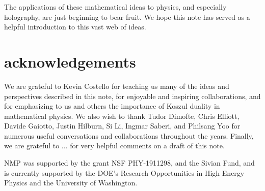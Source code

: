 \documentclass[11pt]{amsart}
\begin{document}
The applications of these mathematical ideas to physics, and especially holography, are just beginning to bear fruit. We hope this note has served as a helpful introduction to this vast web of ideas. 


\section{acknowledgements} We are grateful to Kevin Costello for teaching us many of the ideas and perspectives described in this note, for enjoyable and inspiring collaborations, and for emphasizing to us and others the importance of Koszul duality in mathematical physics. We also wish to thank Tudor Dimofte, Chris Elliott, Davide Gaiotto, Justin Hilburn, Si Li, Ingmar Saberi, and Philsang Yoo for numerous useful conversations and collaborations throughout the years. Finally, we are grateful to ... for very helpful comments on a draft of this note. 

NMP was supported by the grant NSF PHY-1911298, and the Sivian Fund, and is currently supported by the DOE's Research Opportunities in High Energy Physics and the University of Washington. 



\printbibliography
\end{document}
